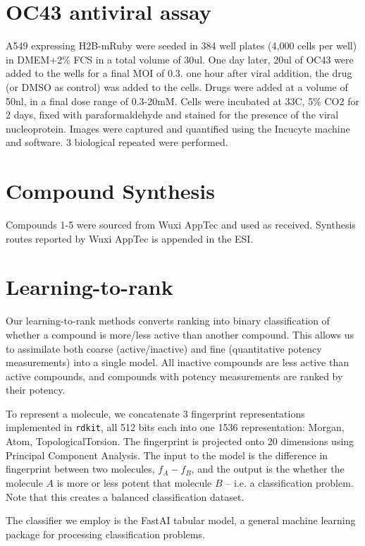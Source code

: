 \section{OC43 antiviral assay}

A549 expressing H2B-mRuby were seeded in 384 well plates (4,000 cells per well) in DMEM+2\% FCS in a total volume of 30ul. One day later, 20ul of OC43 were added to the wells for a final MOI of 0.3. one hour after viral addition, the drug (or DMSO as control) was added to the cells. Drugs were added at a volume of 50nl, in a final dose range of 0.3-20mM. Cells were incubated at 33C, 5\% CO2 for 2 days, fixed with paraformaldehyde and stained for the presence of the viral nucleoprotein. Images were captured and quantified using the Incucyte machine and software. 3 biological repeated were performed.

\section{Compound Synthesis}

Compounds 1-5 were sourced from Wuxi AppTec and used as received. Synthesis routes reported by Wuxi AppTec is appended in the ESI. 


\section{Learning-to-rank} 

Our learning-to-rank methods converts ranking into binary classification of whether a compound is more/less active than another compound. This allows us to assimilate both coarse (active/inactive) and fine (quantitative potency measurements) into a single model. All inactive compounds are less active than active compounds, and compounds with potency measurements are ranked by their potency.  

To represent a molecule, we concatenate 3 fingerprint representations implemented in \texttt{rdkit}, all 512 bits each into one 1536 representation: Morgan, Atom, TopologicalTorsion. The fingerprint is projected onto 20 dimensions using Principal Component Analysis. The input to the model is the difference in fingerprint between two molecules, $f_A - f_B$, and the output is the whether the molecule $A$ is more or less potent that molecule $B$ -- i.e. a classification problem. Note that this creates a balanced classification dataset.  

The classifier we employ is the FastAI tabular model, a general machine learning package for processing classification problems. 

